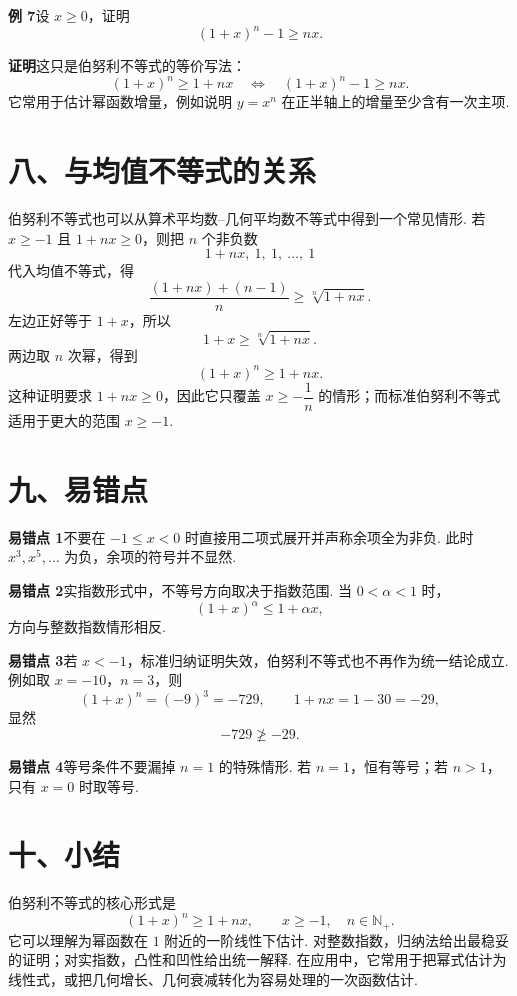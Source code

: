 \documentclass[UTF8,12pt,a4paper,fontset=fandol]{ctexart}
\begin{document}
\noindent\textbf{例 7}\quad 设 $x\ge0$，证明
\[
  (1+x)^n-1\ge nx.
\]

\noindent\textbf{证明}\quad 这只是伯努利不等式的等价写法：
\[
  (1+x)^n\ge1+nx
  \quad\Longleftrightarrow\quad
  (1+x)^n-1\ge nx.
\]
它常用于估计幂函数增量，例如说明 $y=x^n$ 在正半轴上的增量至少含有一次主项.

\section*{八、与均值不等式的关系}

伯努利不等式也可以从算术平均数--几何平均数不等式中得到一个常见情形. 若 $x\ge -1$ 且 $1+nx\ge0$，则把 $n$ 个非负数
\[
  1+nx,\ 1,\ 1,\ \ldots,\ 1
\]
代入均值不等式，得
\[
  \frac{(1+nx)+(n-1)}{n}\ge
  \sqrt[n]{1+nx}.
\]
左边正好等于 $1+x$，所以
\[
  1+x\ge\sqrt[n]{1+nx}.
\]
两边取 $n$ 次幂，得到
\[
  (1+x)^n\ge1+nx.
\]
这种证明要求 $1+nx\ge0$，因此它只覆盖 $x\ge-\dfrac1n$ 的情形；而标准伯努利不等式适用于更大的范围 $x\ge-1$.

\section*{九、易错点}

\noindent\textbf{易错点 1}\quad 不要在 $-1\le x<0$ 时直接用二项式展开并声称余项全为非负. 此时 $x^3,x^5,\ldots$ 为负，余项的符号并不显然.

\noindent\textbf{易错点 2}\quad 实指数形式中，不等号方向取决于指数范围. 当 $0<\alpha<1$ 时，
\[
  (1+x)^\alpha\le1+\alpha x,
\]
方向与整数指数情形相反.

\noindent\textbf{易错点 3}\quad 若 $x<-1$，标准归纳证明失效，伯努利不等式也不再作为统一结论成立. 例如取 $x=-10$，$n=3$，则
\[
  (1+x)^n=(-9)^3=-729,\qquad 1+nx=1-30=-29,
\]
显然
\[
  -729\not\ge -29.
\]

\noindent\textbf{易错点 4}\quad 等号条件不要漏掉 $n=1$ 的特殊情形. 若 $n=1$，恒有等号；若 $n>1$，只有 $x=0$ 时取等号.

\section*{十、小结}

伯努利不等式的核心形式是
\[
  (1+x)^n\ge1+nx,\qquad x\ge-1,\quad n\in\mathbb N_+.
\]
它可以理解为幂函数在 $1$ 附近的一阶线性下估计. 对整数指数，归纳法给出最稳妥的证明；对实指数，凸性和凹性给出统一解释. 在应用中，它常用于把幂式估计为线性式，或把几何增长、几何衰减转化为容易处理的一次函数估计.
\end{document}
